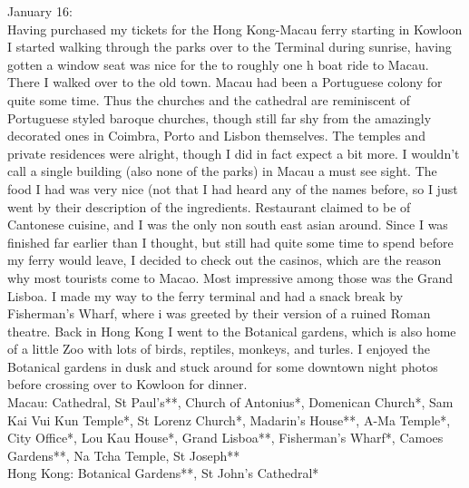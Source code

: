 January 16:\\
Having purchased my tickets for the Hong Kong-Macau ferry starting in Kowloon I started walking through the parks over to the Terminal during sunrise, having gotten a window seat was nice for the to roughly one h boat ride to Macau. There I walked over to the old town. Macau had been a Portuguese colony for quite some time. Thus the churches and the cathedral are reminiscent of Portuguese styled baroque churches, though still far shy from the amazingly decorated ones in Coimbra, Porto and Lisbon themselves. The temples and private residences were alright, though I did in fact expect a bit more. I wouldn't call a single building (also none of the parks) in Macau a must see sight. The food I had was very nice (not that I had heard any of the names before, so I just went by their description of the ingredients. Restaurant claimed to be of Cantonese cuisine, and I was the only non south east asian around. Since I was finished far earlier than I thought, but still had quite some time to spend before my ferry would leave, I decided to check out the casinos, which are the reason why most tourists come to Macao. Most impressive among those was the Grand Lisboa. I made my way to the ferry terminal and had a snack break by Fisherman's Wharf, where i was greeted by their version of a ruined Roman theatre. Back in Hong Kong I went to the Botanical gardens, which is also home of a little Zoo with lots of birds, reptiles, monkeys, and turles. I enjoyed the Botanical gardens in dusk and stuck around for some downtown night photos before crossing over to Kowloon for dinner.\\

Macau: Cathedral, St Paul's**, Church of Antonius*, Domenican Church*, Sam Kai Vui Kun Temple*, St Lorenz Church*, Madarin's House**, A-Ma Temple*, City Office*, Lou Kau House*, Grand Lisboa**, Fisherman's Wharf*, Camoes Gardens**, Na Tcha Temple, St Joseph**\\
Hong Kong: Botanical Gardens**, St John's Cathedral*

